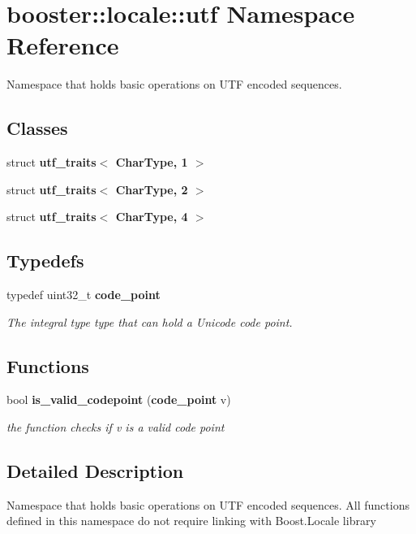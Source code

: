 \section{booster\-:\-:locale\-:\-:utf \-Namespace \-Reference}
\label{namespacebooster_1_1locale_1_1utf}


\-Namespace that holds basic operations on \-U\-T\-F encoded sequences.  


\subsection*{\-Classes}
\begin{DoxyCompactItemize}
\item 
struct {\bf utf\-\_\-traits$<$ Char\-Type, 1 $>$}
\item 
struct {\bf utf\-\_\-traits$<$ Char\-Type, 2 $>$}
\item 
struct {\bf utf\-\_\-traits$<$ Char\-Type, 4 $>$}
\end{DoxyCompactItemize}
\subsection*{\-Typedefs}
\begin{DoxyCompactItemize}
\item 
typedef uint32\-\_\-t {\bf code\-\_\-point}\label{namespacebooster_1_1locale_1_1utf_a99fa30e51629ed1d20e5989b9f36effc}

\begin{DoxyCompactList}\small\item\em \-The integral type type that can hold a \-Unicode code point. \end{DoxyCompactList}\end{DoxyCompactItemize}
\subsection*{\-Functions}
\begin{DoxyCompactItemize}
\item 
bool {\bf is\-\_\-valid\-\_\-codepoint} ({\bf code\-\_\-point} v)\label{namespacebooster_1_1locale_1_1utf_a75c67e9ea9fa30bade54917264b1a19b}

\begin{DoxyCompactList}\small\item\em the function checks if {\itshape v\/} is a valid code point \end{DoxyCompactList}\end{DoxyCompactItemize}


\subsection{\-Detailed \-Description}
\-Namespace that holds basic operations on \-U\-T\-F encoded sequences. \-All functions defined in this namespace do not require linking with \-Boost.\-Locale library 